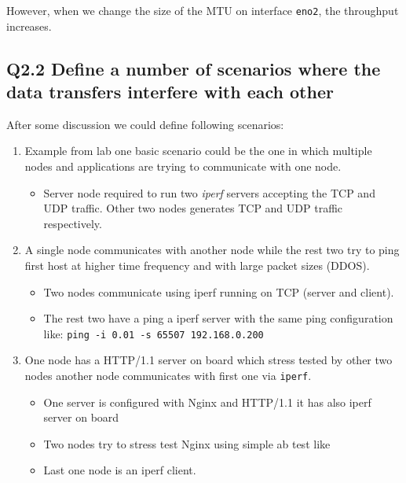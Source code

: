 \documentclass{article}
\begin{document}
However, when we change the size of the MTU on interface \texttt{eno2}, the throughput increases.

\bigskip

\subsection{Q2.2 Define a number of scenarios where the data transfers interfere with each other}
After some discussion we could define following scenarios:

\begin{enumerate}
    \item Example from lab one basic scenario could be the one in which multiple nodes and applications are trying to  communicate  with  one  node.
        \begin{itemize}
            \item Server node required to run two \textit{iperf} servers accepting the TCP and UDP traffic. Other two nodes generates TCP and UDP traffic respectively.
        \end{itemize}
    \item A single node communicates with another node while the rest two try to ping first host at higher time frequency and with large packet sizes (DDOS).
        \begin{itemize}
            \item Two nodes communicate using iperf running on TCP (server and client).
            \item The rest two have a ping a iperf server with the same ping configuration like: \texttt{ping -i 0.01 -s 65507 192.168.0.200}
        \end{itemize}    
    \item One node has a HTTP/1.1 server on board which stress tested by other two nodes another node communicates with first one via \texttt{iperf}.
    \begin{itemize}
        \item One server is configured with Nginx and HTTP/1.1 it has also iperf server on board
        \item Two nodes try to stress test Nginx using simple ab test like 
        \item Last one node is an iperf client.
    \end{itemize}
\end{enumerate}
\end{document}

